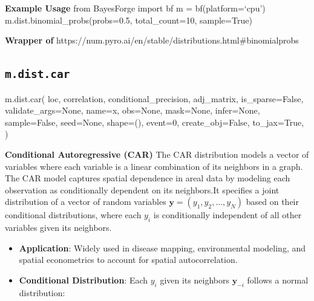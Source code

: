 \documentclass[
  letterpaper,
  DIV=11,
  numbers=noendperiod]{scrartcl}
\newenvironment{Shaded}{\begin{snugshade}}{\end{snugshade}}
\newcommand{\DecValTok}[1]{\textcolor[rgb]{0.68,0.00,0.00}{#1}}
\newcommand{\NormalTok}[1]{\textcolor[rgb]{0.00,0.23,0.31}{#1}}
\newcommand{\OperatorTok}[1]{\textcolor[rgb]{0.37,0.37,0.37}{#1}}
\newcommand{\StringTok}[1]{\textcolor[rgb]{0.13,0.47,0.30}{#1}}
\newcommand{\VariableTok}[1]{\textcolor[rgb]{0.07,0.07,0.07}{#1}}
\begin{document}
\textbf{Example Usage} from BayesForge import bf m = bf(platform=`cpu')
m.dist.binomial\_probs(probs=0.5, total\_count=10, sample=True)

\textbf{Wrapper of}
https://num.pyro.ai/en/stable/distributions.html\#binomialprobs

\subsection{\texorpdfstring{\texttt{m.dist.car}}{m.dist.car}}\label{car}

\begin{Shaded}
\begin{Highlighting}[]
\NormalTok{m.dist.car(}
\NormalTok{    loc,}
\NormalTok{    correlation,}
\NormalTok{    conditional\_precision,}
\NormalTok{    adj\_matrix,}
\NormalTok{    is\_sparse}\OperatorTok{=}\VariableTok{False}\NormalTok{,}
\NormalTok{    validate\_args}\OperatorTok{=}\VariableTok{None}\NormalTok{,}
\NormalTok{    name}\OperatorTok{=}\StringTok{\textquotesingle{}x\textquotesingle{}}\NormalTok{,}
\NormalTok{    obs}\OperatorTok{=}\VariableTok{None}\NormalTok{,}
\NormalTok{    mask}\OperatorTok{=}\VariableTok{None}\NormalTok{,}
\NormalTok{    infer}\OperatorTok{=}\VariableTok{None}\NormalTok{,}
\NormalTok{    sample}\OperatorTok{=}\VariableTok{False}\NormalTok{,}
\NormalTok{    seed}\OperatorTok{=}\VariableTok{None}\NormalTok{,}
\NormalTok{    shape}\OperatorTok{=}\NormalTok{(),}
\NormalTok{    event}\OperatorTok{=}\DecValTok{0}\NormalTok{,}
\NormalTok{    create\_obj}\OperatorTok{=}\VariableTok{False}\NormalTok{,}
\NormalTok{    to\_jax}\OperatorTok{=}\VariableTok{True}\NormalTok{,}
\NormalTok{)}
\end{Highlighting}
\end{Shaded}

\textbf{Conditional Autoregressive (CAR)} The CAR distribution models a
vector of variables where each variable is a linear combination of its
neighbors in a graph. The CAR model captures spatial dependence in areal
data by modeling each observation as conditionally dependent on its
neighbors.It specifies a joint distribution of a vector of random
variables \(\mathbf{y} = (y_1, y_2, \dots, y_N)\) based on their
conditional distributions, where each \(y_i\) is conditionally
independent of all other variables given its neighbors.

\begin{itemize}
\item
  \textbf{Application}: Widely used in disease mapping, environmental
  modeling, and spatial econometrics to account for spatial
  autocorrelation.
\item
  \textbf{Conditional Distribution}: Each \(y_i\) given its neighbors
  \(\mathbf{y}_{-i}\) follows a normal distribution:
\end{itemize}
\end{document}
